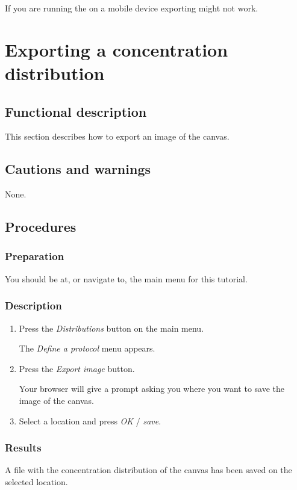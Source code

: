 If you are running the \applicationname on a mobile device exporting might not work.


\section{Exporting a concentration distribution}
\label{sec:exportDist}

\subsection{Functional description}
This section describes how to export an image of the canvas.

\subsection{Cautions and warnings}
None.

\subsection{Procedures}
\subsubsection{Preparation}
You should be at, or navigate to, the main menu for this tutorial.

\subsubsection{Description}
\begin{enumerate}
	\item Press the \emph{Distributions} button on the main menu. 
		\begin{itemize}
            The \emph{Define a protocol} menu appears.
		\end{itemize}
	\item Press the \emph{Export image} button. 
		\begin{itemize}
            Your browser will give a prompt asking you where you want to save the image of the canvas. 
		\end{itemize}
	\item  Select a location and press \emph{OK} / \emph{save}.
\end{enumerate}

\subsubsection{Results}
A file with the concentration distribution of the canvas has been saved on the selected location.

